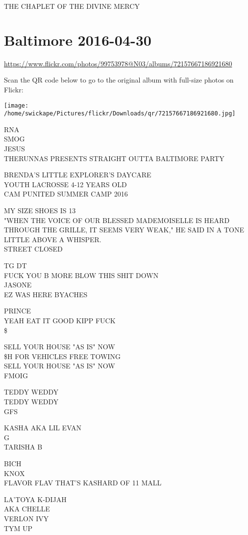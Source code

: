 \documentclass[10pt,letterpaper]{article}
\begin{document}
THE CHAPLET OF THE DIVINE MERCY


\section*{Baltimore 2016-04-30}

\url{https://www.flickr.com/photos/99753978@N03/albums/72157667186921680}

Scan the QR code below to go to the original album with full-size photos on Flickr:

\texttt{[image: /home/swickape/Pictures/flickr/Downloads/qr/72157667186921680.jpg]}


RNA\\
SMOG\\
JESUS\\
THERUNNAS PRESENTS STRAIGHT OUTTA BALTIMORE PARTY

BRENDA'S LITTLE EXPLORER'S DAYCARE\\
YOUTH LACROSSE 4{-}12 YEARS OLD\\
CAM PUNITED SUMMER CAMP 2016

MY SIZE SHOES IS 13\\
"WHEN THE VOICE OF OUR BLESSED MADEMOISELLE IS HEARD THROUGH THE GRILLE, IT SEEMS VERY WEAK," HE SAID IN A TONE LITTLE ABOVE A WHISPER.\\
STREET CLOSED

TG DT\\
FUCK YOU B MORE BLOW THIS SHIT DOWN\\
JASONE\\
EZ WAS HERE BYACHES

PRINCE\\
YEAH EAT IT GOOD KIPP FUCK\\
\$

SELL YOUR HOUSE "AS IS" NOW\\
\$H FOR VEHICLES FREE TOWING\\
SELL YOUR HOUSE "AS IS" NOW\\
FMOIG

TEDDY WEDDY\\
TEDDY WEDDY\\
GFS

KASHA AKA LIL EVAN\\
G\\
TARISHA B

BICH\\
KNOX\\
FLAVOR FLAV THAT'S KASHARD OF 11 MALL

LA'TOYA K{-}DIJAH\\
AKA CHELLE\\
VERLON IVY\\
TYM UP
\end{document}
